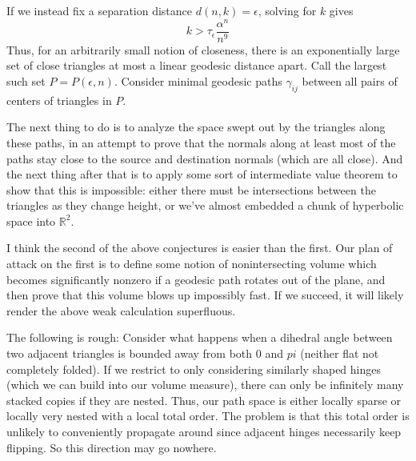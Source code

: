 \documentclass[11pt]{article}
\newcommand{\R}{\mathbb{R}}
\begin{document}
If we instead fix a separation distance $d(n,k) = \epsilon$, solving for $k$ gives
$$k > \tau_\epsilon \frac{\alpha^n}{n^9}$$
Thus, for an arbitrarily small notion of closeness, there is an exponentially large set of close triangles
at most a linear geodesic distance apart.  Call the largest such set $P = P(\epsilon,n)$.
Consider minimal geodesic paths $\gamma_{ij}$ between all pairs of centers of triangles in $P$.

The next thing to do
is to analyze the space swept out by the triangles along these paths, in an attempt to prove that the normals
along at least most of the paths stay close to the source and destination normals (which are all close).
And the next thing after that is to apply some sort of intermediate value theorem to show that this is impossible:
either there must be intersections between the triangles as they change height, or we've almost embedded a chunk of
hyperbolic space into $\R^2$.

I think the second of the above conjectures is easier than the first.  Our plan of attack on the first is to
define some notion of nonintersecting volume which becomes significantly nonzero if a geodesic path rotates
out of the plane, and then prove that this volume blows up impossibly fast.  If we succeed, it will likely
render the above weak calculation superfluous.

The following is rough: Consider what happens when a dihedral angle between two adjacent triangles is bounded
away from both 0 and $pi$ (neither flat not completely folded).  If we restrict to only considering similarly
shaped hinges (which we can build into our volume measure), there can only be infinitely many stacked copies
if they are nested.  Thus, our path space is either locally sparse or locally very nested with a local total order.
The problem is that this total order is unlikely to conveniently propagate around since adjacent hinges necessarily
keep flipping.  So this direction may go nowhere.
\end{document}
